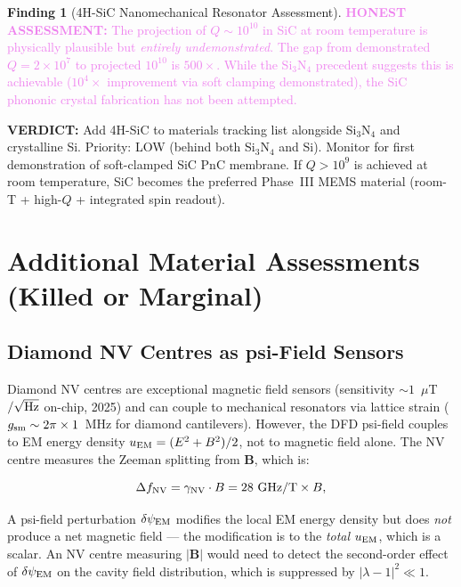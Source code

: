 \documentclass[11pt]{article}
\theoremstyle{definition}
\newtheorem{finding}[theorem]{Finding}
\theoremstyle{remark}
\newcommand{\ee}[1]{\times 10^{#1}}
\newcommand{\dpsi}{\delta\psi_{\rm EM}}
\newcommand{\lam}{|\lambda-1|}
\newcommand{\honest}[1]{\textcolor{violet}{\textbf{HONEST ASSESSMENT:} #1}}
\newcommand{\verdict}[1]{\textcolor{green!50!black}{\textbf{VERDICT:} #1}}
\begin{document}
\begin{finding}[4H-SiC Nanomechanical Resonator Assessment]
\label{find:sic}
\honest{The projection of $Q \sim 10^{10}$ in SiC at room temperature
is physically plausible but \textit{entirely undemonstrated}. The
gap from demonstrated $Q = 2\ee{7}$ to projected $10^{10}$ is
$500\times$. While the Si$_3$N$_4$ precedent suggests this is
achievable ($10^4\times$ improvement via soft clamping demonstrated),
the SiC phononic crystal fabrication has not been attempted.}

\verdict{Add 4H-SiC to materials tracking list alongside Si$_3$N$_4$
and crystalline Si. Priority: LOW (behind both Si$_3$N$_4$ and Si).
Monitor for first demonstration of soft-clamped SiC PnC membrane.
If $Q > 10^9$ is achieved at room temperature, SiC becomes the
preferred Phase~III MEMS material (room-T + high-$Q$ + integrated
spin readout).}
\end{finding}


\section{Additional Material Assessments (Killed or Marginal)}
\label{sec:killed}

\subsection{Diamond NV Centres as psi-Field Sensors}

Diamond NV centres are exceptional magnetic field sensors
(sensitivity $\sim 1$~$\mu$T$/\sqrt{\rm Hz}$ on-chip, 2025) and
can couple to mechanical resonators via lattice strain ($g_{\rm sm}
\sim 2\pi \times 1$~MHz for diamond cantilevers). However, the DFD
psi-field couples to EM energy density $u_{\rm EM} = (E^2 + B^2)/2$,
not to magnetic field alone. The NV centre measures the Zeeman
splitting from $\mathbf{B}$, which is:

\begin{equation}
\Delta f_{\rm NV} = \gamma_{\rm NV} \cdot B
= 28~\text{GHz/T} \times B,
\label{eq:nv_zeeman}
\end{equation}

A psi-field perturbation $\dpsi$ modifies the local EM energy density
but does \textit{not} produce a net magnetic field --- the modification
is to the \textit{total} $u_{\rm EM}$, which is a scalar. An NV
centre measuring $|\mathbf{B}|$ would need to detect the second-order
effect of $\dpsi$ on the cavity field distribution, which is suppressed
by $\lam^2 \ll 1$.
\end{document}
